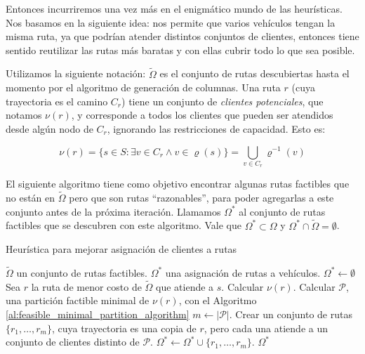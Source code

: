 Entonces incurriremos una vez más en el enigmático mundo de las heurísticas. Nos basamos en la siguiente idea:  nos permite que varios vehículos tengan la misma ruta, ya que podrían atender distintos conjuntos de clientes, entonces tiene sentido reutilizar las rutas más baratas y con ellas cubrir todo lo que sea posible. 

Utilizamos la siguiente notación: $\tilde{\Omega}$ es el conjunto de rutas descubiertas hasta el momento por el algoritmo de generación de columnas. Una ruta $r$ (cuya trayectoria es el camino $C_r$) tiene un conjunto de \emph{clientes potenciales}, que notamos $\nu(r)$, y corresponde a todos los clientes que pueden ser atendidos desde algún nodo de $C_r$, ignorando las restricciones de capacidad. Esto es:

\begin{equation}
    \nu(r) = \{s \in S : \exists v \in C_r \wedge v \in \varrho(s)\} = \bigcup_{v \in C_r}{\varrho^{-1}(v)}
\end{equation}

El siguiente algoritmo tiene como objetivo encontrar algunas rutas factibles que no están en $\tilde{\Omega}$ pero que son rutas ``razonables'', para poder agregarlas a este conjunto antes de la próxima iteración. Llamamos $\Omega^{*}$ al conjunto de rutas factibles que se descubren con este algoritmo. Vale que $\Omega^{*} \subset \Omega$ y $\Omega^{*} \cap \tilde{\Omega} = \emptyset$.

\begin{algorithm}[H]
  \caption{Heurística para mejorar asignación de clientes a rutas}
  \label{al:2-step-cg-main}
  \begin{algorithmic}[1]
  	\Require $\tilde{\Omega}$ un conjunto de rutas factibles.
  	\Ensure $\Omega^{*}$ una asignación de rutas a vehículos. 
        \State $\Omega^{*} \gets \emptyset$
                \State Sea $r$ la ruta de menor costo de $\tilde{\Omega}$ que atiende a $s$.
                \State Calcular $\nu(r)$.
                \State Calcular $\mathscr{P}$, una partición factible minimal de $\nu(r)$, con el Algoritmo \ref{al:feasible_minimal_partition_algorithm}
                \State $m \gets |\mathscr{P}|$.
                \State Crear un conjunto de rutas $\{r_1, \dots, r_m\}$, cuya trayectoria es una copia de $r$, pero cada una atiende a un conjunto de clientes distinto de $\mathscr{P}$.
                \State $\Omega^{*} \gets \Omega^{*} \cup \{r_1, \dots, r_m\}$.
            \EndIf
        \EndFor
	\Return $\Omega^{*}$
  \end{algorithmic}
\end{algorithm}

